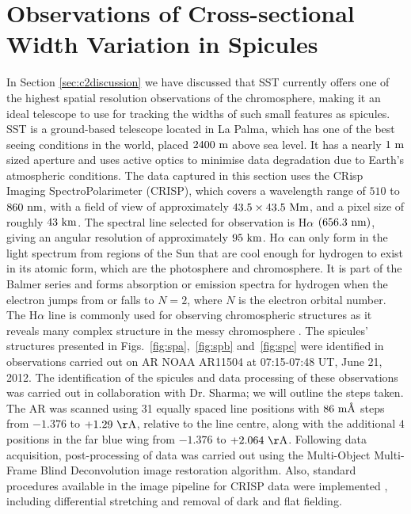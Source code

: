 \section{Observations of Cross-sectional Width Variation in Spicules}
\label{sec:CSW_spicules}
In Section \ref{sec:c2discussion} we have discussed that SST currently offers one of the highest spatial resolution observations of the chromosphere, making it an ideal telescope to use for tracking the widths of such small features as spicules. SST is a ground-based telescope located in La Palma, which has one of the best seeing conditions in the world, placed $2400~\rm{m}$ above sea level. It has a nearly $1~\rm{m}$ sized aperture and uses active optics to minimise data degradation due to Earth's atmospheric conditions. The data captured in this section uses the CRisp Imaging SpectroPolarimeter (CRISP), which covers a wavelength range of $510$ to $860~\rm{nm}$, with a field of view of approximately $43.5\times43.5~\rm{Mm}$, and a pixel size of roughly $43~\rm{km}$. The spectral line selected for observation is H$\alpha$ $(656.3~\rm{nm})$, giving an angular resolution of approximately $95~\rm{km}$. H$\alpha$ can only form in the light spectrum from regions of the Sun that are cool enough for hydrogen to exist in its atomic form, which are the photosphere and chromosphere. It is part of the Balmer series and forms absorption or emission spectra for hydrogen when the electron jumps from or falls to $N=2$, where $N$ is the electron orbital number. The H$\alpha$ line is commonly used for observing chromospheric structures as it reveals many complex structure in the messy chromosphere \citep{Parmenter1966PASP78250P, von1985AA146192V, Nishikawa1988PASJ40613N, Judge2006ASPC354259J, Leenaarts2007AA473625L, Rutten2008ASPC39754R, Jess2012ApJ744L5J, Pereira2016ApJ82465P, Rutten2017AA598A89R}. \np
The spicules' structures presented in Figs.~\ref{fig:spa},~\ref{fig:spb} and~\ref{fig:spc} were identified in observations carried out on AR NOAA AR11504 at 07:15-07:48 UT, June 21, 2012. The identification of the spicules and data processing of these observations was carried out in collaboration with Dr. Sharma; we will outline the steps taken. The AR was scanned using 31 equally spaced line positions with $86~\rm{m\textup{\AA}}$ steps from $-1.376$ to $+1.29~\rm{\AA}$, relative to the line centre, along with the additional $4$ positions in the far blue wing from $-1.376$ to $+2.064~\rm{\AA}$. Following data acquisition, post-processing of data was carried out using the Multi-Object Multi-Frame Blind Deconvolution \citep[MOMFBD;][]{van2005SoPh228191V} image restoration algorithm. Also, standard procedures available in the image pipeline for CRISP data were implemented \citep{2015}, including differential stretching and removal of dark and flat fielding. \np
